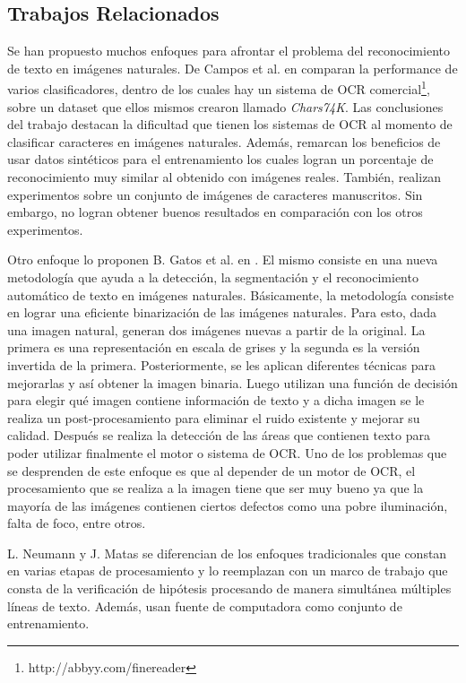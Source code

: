 \subsection{Trabajos Relacionados}
	
	Se han propuesto muchos enfoques para afrontar el problema del reconocimiento de texto en imágenes naturales. De Campos et al. en \cite{dCBV09} comparan la performance de varios clasificadores, dentro de los cuales hay un sistema de OCR comercial\footnote{http://abbyy.com/finereader}, sobre un dataset que ellos mismos crearon llamado \textit{Chars74K}. Las conclusiones del trabajo destacan la dificultad que tienen los sistemas de OCR al momento de clasificar caracteres en imágenes naturales. Además, remarcan los beneficios de usar datos sintéticos para el entrenamiento los cuales logran un porcentaje de reconocimiento muy similar al obtenido con imágenes reales. También, realizan experimentos sobre un conjunto de imágenes de caracteres manuscritos. Sin embargo, no logran obtener buenos resultados en comparación con los otros experimentos. 
	
	Otro enfoque lo proponen B. Gatos et al. en \cite{GPP03}. El mismo consiste en una nueva metodología que ayuda a la detección, la segmentación y el reconocimiento automático de texto en imágenes naturales. Básicamente, la metodología consiste en lograr una eficiente binarización de las imágenes naturales. Para esto, dada una imagen natural, generan dos imágenes nuevas a partir de la original. La primera es una representación en escala de grises y la segunda es la versión invertida de la primera. Posteriormente, se les aplican diferentes técnicas para mejorarlas y así obtener la imagen binaria. Luego utilizan una función de decisión para elegir qué imagen contiene información de texto y a dicha imagen se le realiza un post-procesamiento para eliminar el ruido existente y mejorar su calidad. Después se realiza la detección de las áreas que contienen texto para poder utilizar finalmente el motor o sistema de OCR. Uno de los problemas que se desprenden de este enfoque es que al depender de un motor de OCR, el procesamiento que se realiza a la imagen tiene que ser muy bueno ya que la mayoría de las imágenes contienen ciertos defectos como una pobre iluminación, falta de foco, entre otros.

	L. Neumann y J. Matas \cite{LNJM} se diferencian de los enfoques tradicionales que constan en varias etapas de procesamiento y lo reemplazan con un marco de trabajo que consta de la verificación de hipótesis procesando de manera simultánea múltiples líneas de texto. Además, usan fuente de computadora como conjunto de entrenamiento.
	